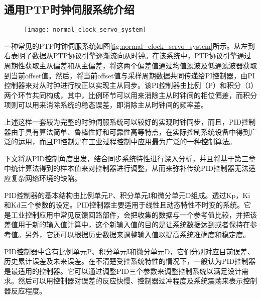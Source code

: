 \subsection{通用PTP时钟伺服系统介绍}
\begin{figure}[hbp]
  \centering
  \begin{minipage}[b]{0.7\textwidth}
   \captionstyle{\centering}
   \centering
   \texttt{[image: normal\_clock\_servo\_system]}
  \end{minipage}
\end{figure}

一种常见的PTP时钟伺服系统如图\ref{fig:normal_clock_servo_system}所示\supercite{58}。从左到右表明了数据从PTP协议引擎逐渐流向从时钟。在该系统中，PTP协议引擎通过周期性获取主从偏差和从主偏差，将这两个偏差值通过均值滤波及低通滤波器获取到当前offset值。然后，将当前offset值与采样周期数据共同传递给PI控制器，由PI控制器来对从时钟进行校正以实现主从同步。该PI控制器由比例（P）和积分（I）两个环节共同构成，其中，比例环节可以用来消除主从时钟间的相位偏差，而积分项则可以用来消除系统的稳态误差，即消除主从时钟间的频率差\supercite{58}。

上述这样一套较为完整的时钟伺服系统可以较好的实现时钟同步，而且，PID控制器由于具有算法简单、鲁棒性好和可靠性高等特点，在实际控制系统设备中得到广泛的运用，而且PI控制是在工业过程控制中应用最为广泛的一种控制算法。

下文将从PID控制角度出发，结合同步系统特性进行深入分析，并且将基于第三章中统计算法得到的样本值来对控制器进行调整，从而来弥补传统PID控制器无法适应复杂网络环境的缺陷。

PID控制器的基本结构由比例单元P、积分单元I和微分单元D组成。透过Kp，Ki和Kd三个参数的设定。PID控制器主要适用于线性且动态特性不时变的系统。它是工业控制应用中常见反馈回路部件，会把收集的数据与一个参考值比较，并把该差值用于新的输入值计算中，这个新输入值的目的是让系统数据达到或者保持在参考值。另外，它还可以根据历史数据来调整输入值以提高系统准确度和稳定度。

PID控制器中含有比例单元P、积分单元I和微分单元D，它们分别对应目前误差、历史累计误差及未来误差。在不清楚受控系统特性的情况下，一般认为PID控制器是最适用的控制器。它可以通过调整PID三个参数来调整控制系统以满足设计需求。然后可以用控制器对误差的反应快慢、控制器过冲程度及系统震荡来表示控制器反应程度。


